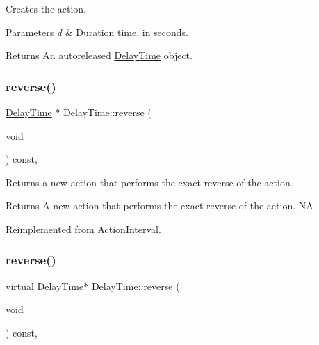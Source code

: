 Creates the action. 
\begin{DoxyParams}{Parameters}
{\em d} & Duration time, in seconds. \\
\hline
\end{DoxyParams}
\begin{DoxyReturn}{Returns}
An autoreleased \hyperlink{classDelayTime}{Delay\+Time} object. 
\end{DoxyReturn}
\mbox{\label{classDelayTime_a83764e1720652642ff03088f0a311c95}} 
\subsubsection{\texorpdfstring{reverse()}{reverse()}\hspace{0.1cm}{\footnotesize\ttfamily [1/2]}}
{\footnotesize\ttfamily \hyperlink{classDelayTime}{Delay\+Time} $\ast$ Delay\+Time\+::reverse (\begin{DoxyParamCaption}\item[{void}]{ }\end{DoxyParamCaption}) const\hspace{0.3cm}{\ttfamily [override]}, {\ttfamily [virtual]}}

Returns a new action that performs the exact reverse of the action.

\begin{DoxyReturn}{Returns}
A new action that performs the exact reverse of the action.  NA 
\end{DoxyReturn}


Reimplemented from \hyperlink{classActionInterval_a9f9ac7164036a0bc261a72f62a2b2da7}{Action\+Interval}.

\mbox{\label{classDelayTime_af420fc66d739d4a414057548cb1dff5c}} 
\subsubsection{\texorpdfstring{reverse()}{reverse()}\hspace{0.1cm}{\footnotesize\ttfamily [2/2]}}
{\footnotesize\ttfamily virtual \hyperlink{classDelayTime}{Delay\+Time}$\ast$ Delay\+Time\+::reverse (\begin{DoxyParamCaption}\item[{void}]{ }\end{DoxyParamCaption}) const\hspace{0.3cm}{\ttfamily [override]}, {\ttfamily [virtual]}}

